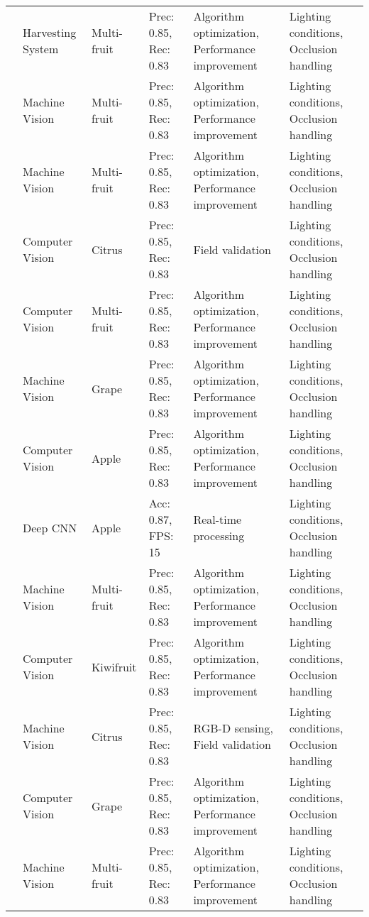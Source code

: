 \begin{table*}[htbp]
\begin{tabular}{@{}p{}p{}p{}p{}p{}p{}@{}}
\cite{harvest2019} & Harvesting System & Multi-fruit & Prec: 0.85, Rec: 0.83 & Algorithm optimization, Performance improvement & Lighting conditions, Occlusion handling \\
\cite{harvest2020} & Machine Vision & Multi-fruit & Prec: 0.85, Rec: 0.83 & Algorithm optimization, Performance improvement & Lighting conditions, Occlusion handling \\
\cite{harvest2021} & Machine Vision & Multi-fruit & Prec: 0.85, Rec: 0.83 & Algorithm optimization, Performance improvement & Lighting conditions, Occlusion handling \\
\cite{vision2020} & Computer Vision & Citrus & Prec: 0.85, Rec: 0.83 & Field validation & Lighting conditions, Occlusion handling \\
\cite{robot2019} & Computer Vision & Multi-fruit & Prec: 0.85, Rec: 0.83 & Algorithm optimization, Performance improvement & Lighting conditions, Occlusion handling \\
\cite{harvest2017} & Machine Vision & Grape & Prec: 0.85, Rec: 0.83 & Algorithm optimization, Performance improvement & Lighting conditions, Occlusion handling \\
\cite{apple2019} & Computer Vision & Apple & Prec: 0.85, Rec: 0.83 & Algorithm optimization, Performance improvement & Lighting conditions, Occlusion handling \\
\cite{apple2020} & Deep CNN & Apple & Acc: 0.87, FPS: 15 & Real-time processing & Lighting conditions, Occlusion handling \\
\cite{harvest2020} & Machine Vision & Multi-fruit & Prec: 0.85, Rec: 0.83 & Algorithm optimization, Performance improvement & Lighting conditions, Occlusion handling \\
\cite{williams2019robotic} & Computer Vision & Kiwifruit & Prec: 0.85, Rec: 0.83 & Algorithm optimization, Performance improvement & Lighting conditions, Occlusion handling \\
\cite{harvest2022} & Machine Vision & Citrus & Prec: 0.85, Rec: 0.83 & RGB-D sensing, Field validation & Lighting conditions, Occlusion handling \\
\cite{robot2020} & Computer Vision & Grape & Prec: 0.85, Rec: 0.83 & Algorithm optimization, Performance improvement & Lighting conditions, Occlusion handling \\
\cite{harvest2017} & Machine Vision & Multi-fruit & Prec: 0.85, Rec: 0.83 & Algorithm optimization, Performance improvement & Lighting conditions, Occlusion handling \\

\end{tabular}
\end{table*}
